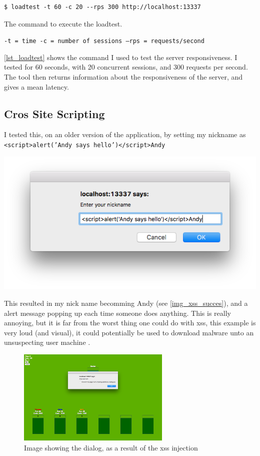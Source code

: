 \documentclass[a4paper]{article}
\begin{document}
\begin{listing}[H]
\centering
\begin{verbatim}
$ loadtest -t 60 -c 20 --rps 300 http://localhost:13337
\end{verbatim}
\caption{The command to execute the loadtest.}
\label{lst_loadtest}
\texttt{-t = time   -c = number of sessions  --rps = requests/second}
\end{listing}

\autoref{lst_loadtest} shows the command I used to test the server responsiveness. I tested for 60 seconds, with 20 concurrent sessions, and 300 requests per second.\\

The tool then returns information about the responsiveness of the server, and gives a mean latency.




\subsection{Cros Site Scripting}
I tested this, on an older version of the application, by setting my nickname as \texttt{<script>alert('Andy says hello')</script>Andy}

\begin{center}
	\includegraphics[width=.5\textwidth]{images/xss_input}
\end{center}

This resulted in my nick name becomming Andy (see \autoref{img_xss_succes}), and a alert message popping up each time someone does anything. This is really annoying, but it is far from the worst thing one could do with xss, this example is very loud (and visual), it could potentially be used to download malware unto an unsuspecting user machine \cite{xss_consequences}.

\begin{figure}[H]
  \centering
  \includegraphics[width=0.65\textwidth]{images/xss_dialog}
  \caption{Image showing the dialog, as a result of the xss injection}
  \label{img_xss_succes}
\end{figure}
\end{document}
